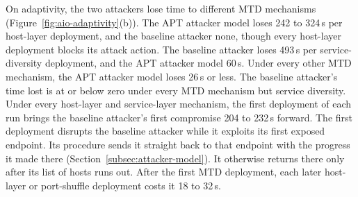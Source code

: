 \documentclass{cshonours}
\newcommand{\prelim}[1]{#1}
\begin{document}
On adaptivity, the two attackers lose time to different MTD mechanisms
(Figure~\ref{fig:aio-adaptivity}(b)). The APT attacker model loses
\prelim{242} to \prelim{324}\,s per host-layer deployment, and the baseline
attacker none, though every host-layer deployment blocks its attack action.
The baseline attacker loses \prelim{493}\,s per service-diversity deployment,
and the APT attacker model \prelim{60}\,s. Under every other MTD mechanism,
the APT attacker model loses \prelim{26}\,s or less.
The baseline attacker's time lost is at or below zero under every MTD mechanism but
service diversity. Under every host-layer and service-layer mechanism, the
first deployment of each run brings the baseline attacker's first compromise
\prelim{204} to \prelim{232}\,s forward. The first deployment disrupts the
baseline attacker while it exploits its first exposed endpoint. Its
procedure sends it straight back to that endpoint with the progress it
made there (Section~\ref{subsec:attacker-model}). It otherwise returns there
only after its list of hosts runs out.
After the first MTD deployment, each
later host-layer or port-shuffle deployment costs it \prelim{18} to
\prelim{32}\,s.
\end{document}
